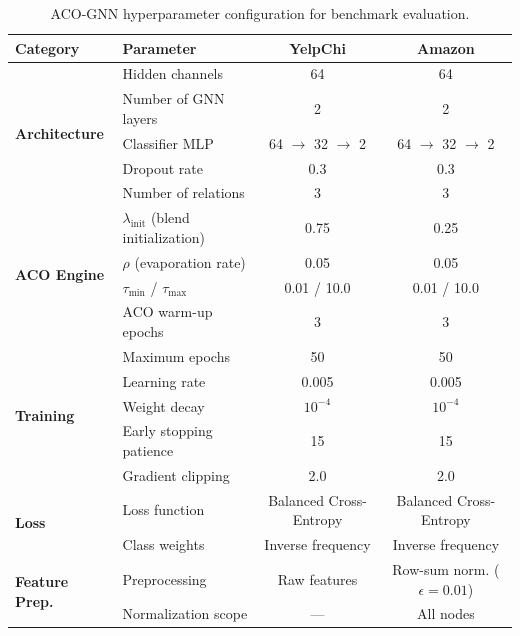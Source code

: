 \begin{table}[htbp]
\centering
\footnotesize
\setlength{\tabcolsep}{2pt}
\caption[ACO-GNN hyperparameter configuration]{ACO-GNN hyperparameter configuration for benchmark evaluation.}
\label{tab:hyperparams}
\begin{tabular}{llcc}
\toprule
\textbf{Category} & \textbf{Parameter} & \textbf{YelpChi} & \textbf{Amazon} \\
\midrule
\multirow{5}{*}{\textbf{Architecture}} 
    & Hidden channels      & 64      & 64 \\
    & Number of GNN layers & 2       & 2 \\
    & Classifier MLP       & 64 $\to$ 32 $\to$ 2 & 64 $\to$ 32 $\to$ 2 \\
    & Dropout rate          & 0.3     & 0.3 \\
    & Number of relations   & 3       & 3 \\
\midrule
\multirow{4}{*}{\textbf{ACO Engine}} 
    & $\lambda_{\text{init}}$ (blend initialization)  & 0.75  & 0.25 \\
    & $\rho$ (evaporation rate)                        & 0.05  & 0.05 \\
    & $\tau_{\min}$ / $\tau_{\max}$                    & 0.01 / 10.0 & 0.01 / 10.0 \\
    & ACO warm-up epochs                               & 3     & 3 \\
\midrule
\multirow{5}{*}{\textbf{Training}} 
    & Maximum epochs           & 50    & 50 \\
    & Learning rate            & 0.005 & 0.005 \\
    & Weight decay             & $10^{-4}$ & $10^{-4}$ \\
    & Early stopping patience  & 15    & 15 \\
    & Gradient clipping        & 2.0   & 2.0 \\
\midrule
\multirow{2}{*}{\textbf{Loss}} 
    & Loss function            & Balanced Cross-Entropy & Balanced Cross-Entropy \\
    & Class weights            & Inverse frequency & Inverse frequency \\
\midrule
\multirow{2}{*}{\textbf{Feature Prep.}} 
    & Preprocessing            & Raw features & Row-sum norm. ($\epsilon = 0.01$) \\
    & Normalization scope      & --- & All nodes \\
\bottomrule
\end{tabular}
\end{table}

